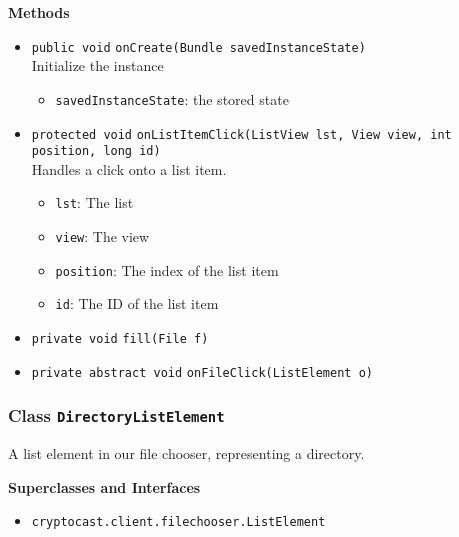 \textbf{Methods}
\begin{itemize}
\item \lstinline|public void| \lstinline|onCreate|\lstinline|(Bundle savedInstanceState)|\\
Initialize the instance
\begin{itemize}
\item \lstinline|savedInstanceState|: the stored state
\end{itemize}



\item \lstinline|protected void| \lstinline|onListItemClick|\lstinline|(ListView lst, View view, int position, long id)|\\
Handles a click onto a list item.
\begin{itemize}
\item \lstinline|lst|: The list
\item \lstinline|view|: The view
\item \lstinline|position|: The index of the list item
\item \lstinline|id|: The ID of the list item
\end{itemize}



\item \lstinline|private void| \lstinline|fill|\lstinline|(File f)|




\item \lstinline|private abstract void| \lstinline|onFileClick|\lstinline|(ListElement o)|




\end{itemize}

\subsubsection{Class \lstinline|DirectoryListElement|}
A list element in our file chooser, representing a directory. \\



\textbf{Superclasses and Interfaces}
\begin{itemize}
\item \lstinline|cryptocast.client.filechooser.ListElement|
\end{itemize}



